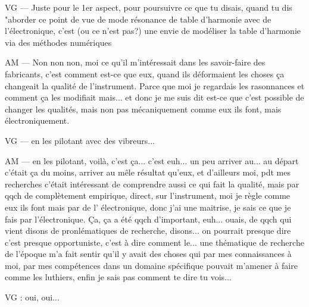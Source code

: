 VG — Juste pour le 1er aspect, pour poursuivre ce que tu disais, quand tu dis "aborder ce point de vue de mode résonance de table d'harmonie avec de l'électronique, c'est (ou ce n'est pas?) une envie de modéliser la table d'harmonie via des méthodes numériques

AM — Non non non, moi ce qu'il m'intéressait dans les savoir-faire des fabricants, c'est comment  est-ce que eux, quand ils déformaient les choses ça changeait la qualité de l'instrument. Parce que moi je regardais les rasonnances et comment ça les modifiait mais... et donc je me suis dit est-ce que c'est possible de changer les qualités, mais non pas mécaniquement comme eux ils font, mais électroniquement.

VG — en les pilotant avec des vibreurs... 

AM — en les pilotant, voilà, c'est ça... c'est euh... un peu arriver au... au départ c'était ça du moins, arriver au mêle résultat qu'eux, et d'ailleurs moi, pdt mes recherches c'était intéressant de comprendre aussi ce qui fait la qualité, mais par qqch de complètement empirique, direct, sur l'instrument, moi je règle comme eux ils font mais par de l' électronique, donc j'ai une maitrise, je sais ce que je fais par l'électronique.
Ça, ça a été qqch d'important, euh... ouais, de qqch qui vient disons de pronlématiques de recherche, disons... on pourrait presque dire c'est presque opportuniste, c'est à dire comment le... une thématique de recherche de l'époque m'a fait sentir qu'il y avait des choses qui par mes connaissances à moi, par mes compétences dans un domaine spécifique pouvait m'amener à faire comme les luthiers, enfin je sais pas comment te dire tu vois... 

VG  : oui, oui... 

